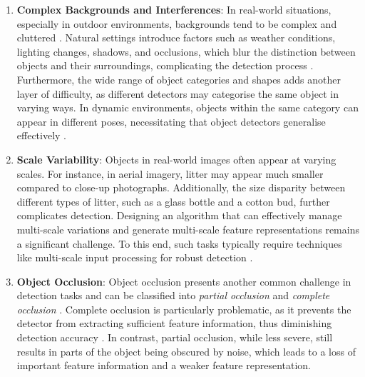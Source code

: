 \begin{enumerate}[label=\textbf{\arabic*.}]
    \item \textbf{Complex Backgrounds and Interferences}: In real-world situations, especially in outdoor environments, backgrounds tend to be complex and cluttered \cite{od_survey_problems, od_2}. Natural settings introduce factors such as weather conditions, lighting changes, shadows, and occlusions, which blur the distinction between objects and their surroundings, complicating the detection process \cite{four_pillars_od}. Furthermore, the wide range of object categories and shapes adds another layer of difficulty, as different detectors may categorise the same object in varying ways. In dynamic environments, objects within the same category can appear in different poses, necessitating that object detectors generalise effectively \cite{od_survey_problems}.

    \item \textbf{Scale Variability}: Objects in real-world images often appear at varying scales. For instance, in aerial imagery, litter may appear much smaller compared to close-up photographs. Additionally, the size disparity between different types of litter, such as a glass bottle and a cotton bud, further complicates detection. Designing an algorithm that can effectively manage multi-scale variations and generate multi-scale feature representations remains a significant challenge. To this end, such tasks typically require techniques like multi-scale input processing for robust detection \cite{od_survey_problems, four_pillars_od}.

    \item \textbf{Object Occlusion}: Object occlusion presents another common challenge in detection tasks and can be classified into \textit{partial occlusion} and \textit{complete occlusion} \cite{od_survey_problems, od_problem, survey_od_2}. Complete occlusion is particularly problematic, as it prevents the detector from extracting sufficient feature information, thus diminishing detection accuracy \cite{od_survey_problems}. In contrast, partial occlusion, while less severe, still results in parts of the object being obscured by noise, which leads to a loss of important feature information and a weaker feature representation.



\end{enumerate}
